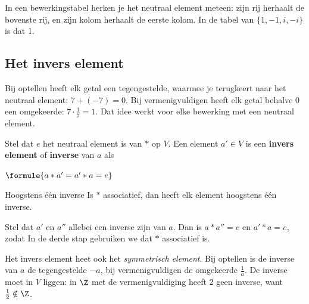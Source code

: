 In een bewerkingstabel herken je het neutraal element meteen: zijn rij herhaalt de bovenste rij, en zijn kolom herhaalt de eerste kolom. In de tabel van $\{1, -1, i, -i\}$ is dat 1.

\subsection{Het invers element}

Bij optellen heeft elk getal een tegengestelde, waarmee je terugkeert naar het neutraal element: $7 + (-7) = 0$. Bij vermenigvuldigen heeft elk getal behalve 0 een omgekeerde: $7 \cdot \frac17 = 1$. Dat idee werkt voor elke bewerking met een neutraal element.

\begin{theorie}
Stel dat $e$ het neutraal element is van $\ast$ op $V$. Een element $a' \in V$ is een \textbf{\textcolor{accent}{invers element}} of \textbf{\textcolor{accent}{inverse}} van $a$ als

\vspace{1mm}
\qquad $\formule{a \ast a' = a' \ast a = e}$

\begin{stelling}{Hoogstens één inverse}
Is $\ast$ associatief, dan heeft elk element hoogstens één inverse.
\end{stelling}

\begin{bewijs}
Stel dat $a'$ en $a''$ allebei een inverse zijn van $a$. Dan is $a \ast a'' = e$ en $a' \ast a = e$, zodat
In de derde stap gebruiken we dat $\ast$ associatief is.
\end{bewijs}
\end{theorie}

Het invers element heet ook het \textit{symmetrisch element}. Bij optellen is de inverse van $a$ de tegengestelde $-a$, bij vermenigvuldigen de omgekeerde $\frac1a$. De inverse moet in $V$ liggen: in $\Z$ met de vermenigvuldiging heeft 2 geen inverse, want $\frac12 \notin \Z$.


